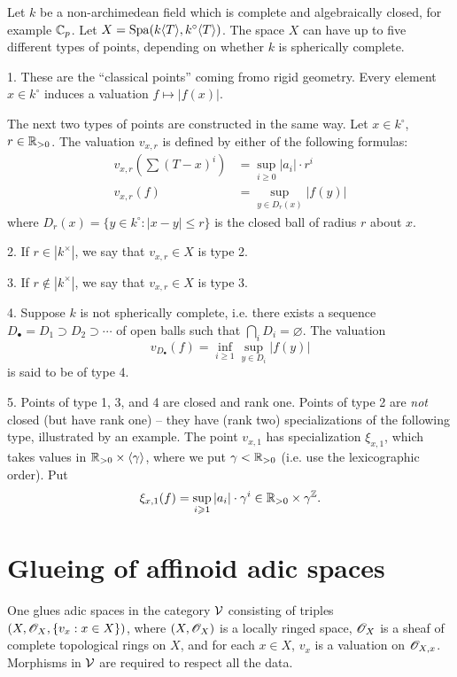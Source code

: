 \documentclass{article}
\begin{document}
\begin{example}
Let $k$ be a non-archimedean field which is complete and algebraically closed, 
for example $\mathbb{C}_p$. Let $X=\operatorname{Spa}(k\langle T\rangle, k^\circ\langle T\rangle)$. 
The space $X$ can have up to five different types of points, depending on 
whether $k$ is spherically complete. 

1. These are the ``classical points'' coming fromo rigid geometry. Every 
element $x\in k^\circ$ induces a valuation $f\mapsto |f(x)|$. 

The next two types of points are constructed in the same way. Let 
$x\in k^\circ$, $r\in \mathbb{R}_{>0}$. The valuation $v_{x,r}$ is defined by 
either of the following formulas:
\begin{align*}
  v_{x,r}\left(\sum (T-x)^i\right) &= \sup_{i\geqslant 0} |a_i|\cdot r^i \\
  v_{x,r}(f) &= \sup_{y\in D_r(x)} |f(y)|
\end{align*}
where $D_r(x) = \{y\in k^\circ:|x-y|\leqslant r\}$ is the closed ball of 
radius $r$ about $x$. 

2. If $r\in |k^\times|$, we say that $v_{x,r}\in X$ is type 2. 

3. If $r\notin |k^\times|$, we say that $v_{x,r}\in X$ is type 3. 

4. Suppose $k$ is not spherically complete, i.e. there exists a sequence 
$D_\bullet = D_1\supset D_2\supset \cdots$ of open balls such that 
$\bigcap_i D_i = \varnothing$. The valuation 
\[
  v_{D_\bullet}(f) = \inf_{i\geqslant 1} \sup_{y\in D_i} |f(y)|
\]
is said to be of type 4. 

5. Points of type 1, 3, and 4 are closed and rank one. Points of type 2 are 
\emph{not} closed (but have rank one) -- they have (rank two) specializations 
of the following type, illustrated by an example. The point $v_{x,1}$ has 
specialization $\xi_{x,1}$, which takes values in 
$\mathbb{R}_{>0}\times \langle \gamma\rangle$, where we put $\gamma<\mathbb{R}_{>0}$ (i.e. 
use the lexicographic order). Put 
\[
  \xi_{x,1}(f) = \sup_{i\geqslant 1} |a_i|\cdot \gamma^i \in \mathbb{R}_{>0}\times \gamma^{\mathbb{Z}} .
\]
\end{example}





\section{Glueing of affinoid adic spaces}

One glues adic spaces in the category $\mathcal{V}$ consisting of triples 
$(X,\mathscr{O}_X,\{v_x:x\in X\})$, where $(X,\mathscr{O}_X)$ is a locally ringed space, 
$\mathscr{O}_X$ is a sheaf of complete topological rings on $X$, and for each 
$x\in X$, $v_x$ is a valuation on $\mathscr{O}_{X,x}$. Morphisms in $\mathcal{V}$ are required 
to respect all the data. 
\end{document}
